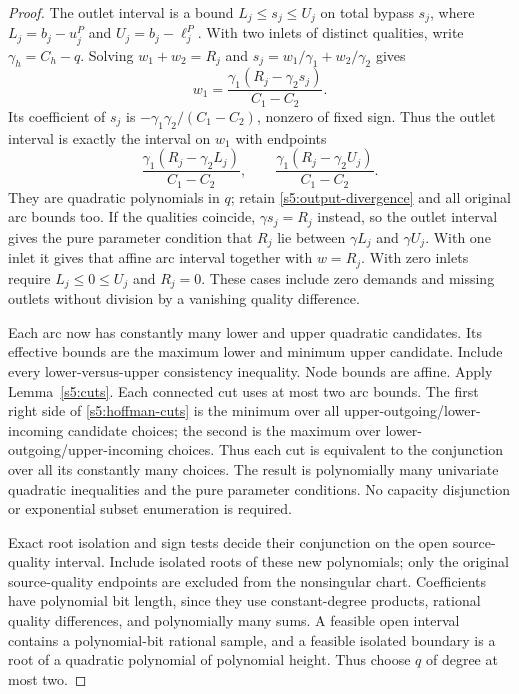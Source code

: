 \begin{proof}
The outlet interval is a bound $L_j\le s_j\le U_j$ on total bypass
$s_j$, where $L_j=b_j-u_j^P$ and $U_j=b_j-\ell_j^P$. With two inlets
of distinct qualities, write $\gamma_h=C_h-q$. Solving
$w_1+w_2=R_j$ and $s_j=w_1/\gamma_1+w_2/\gamma_2$ gives
\begin{equation}
 w_1=\frac{\gamma_1(R_j-\gamma_2s_j)}{C_1-C_2}.
 \label{s5:outlet-arc}
\end{equation}
Its coefficient of $s_j$ is
$-\gamma_1\gamma_2/(C_1-C_2)$, nonzero of fixed sign. Thus the outlet
interval is exactly the interval on $w_1$ with endpoints
\begin{equation}
 \frac{\gamma_1(R_j-\gamma_2L_j)}{C_1-C_2},\qquad
 \frac{\gamma_1(R_j-\gamma_2U_j)}{C_1-C_2}.
 \label{s5:quadratic-bounds}
\end{equation}
They are quadratic polynomials in $q$; retain
\eqref{s5:output-divergence} and all original arc bounds too.
If the qualities coincide, $\gamma s_j=R_j$ instead, so the outlet
interval gives the pure parameter condition that $R_j$ lie between
$\gamma L_j$ and $\gamma U_j$. With one inlet it gives that affine
arc interval together with $w=R_j$. With zero inlets require
$L_j\le0\le U_j$ and $R_j=0$. These cases include zero demands and
missing outlets without division by a vanishing quality difference.

Each arc now has constantly many lower and upper quadratic candidates.
Its effective bounds are the maximum lower and minimum upper candidate.
Include every lower-versus-upper consistency inequality. Node bounds
are affine. Apply Lemma~\ref{s5:cuts}. Each connected cut uses at most
two arc bounds. The first right side of \eqref{s5:hoffman-cuts} is the
minimum over all upper-outgoing/lower-incoming candidate choices; the
second is the maximum over lower-outgoing/upper-incoming choices.
Thus each cut is equivalent to the conjunction over all its constantly
many choices. The result is polynomially many univariate quadratic
inequalities and the pure parameter conditions. No capacity disjunction
or exponential subset enumeration is required.

Exact root isolation and sign tests decide their conjunction on the
open source-quality interval. Include isolated roots of these new
polynomials; only the original source-quality endpoints are excluded
from the nonsingular chart. Coefficients have polynomial bit length,
since they use constant-degree products, rational quality differences,
and polynomially many sums. A feasible open interval contains a
polynomial-bit rational sample, and a feasible isolated boundary is a
root of a quadratic polynomial of polynomial height. Thus choose $q$
of degree at most two.


\end{proof}
